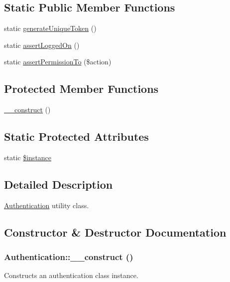 \subsection*{Static Public Member Functions}
\begin{DoxyCompactItemize}
\item 
static \hyperlink{classAuthentication_a8df399ee7f9eca617e6249935dae2a88}{generateUniqueToken} ()
\item 
static \hyperlink{classAuthentication_a6e29c7efa70a367135d3e7bf464fad52}{assertLoggedOn} ()
\item 
static \hyperlink{classAuthentication_a11dc5e2b83d14bcbcc35c7dd5584a1e5}{assertPermissionTo} (\$action)
\end{DoxyCompactItemize}
\subsection*{Protected Member Functions}
\begin{DoxyCompactItemize}
\item 
\hyperlink{classAuthentication_a123a88a49f2dea1247f39a60de1c722c}{\_\-\_\-construct} ()
\end{DoxyCompactItemize}
\subsection*{Static Protected Attributes}
\begin{DoxyCompactItemize}
\item 
static \hyperlink{classAuthentication_afc3982cbe2a9766da03e6291249eddb4}{\$instance}
\end{DoxyCompactItemize}


\subsection{Detailed Description}
\hyperlink{classAuthentication}{Authentication} utility class. 

\subsection{Constructor \& Destructor Documentation}
\hypertarget{classAuthentication_a123a88a49f2dea1247f39a60de1c722c}{
\subsubsection[{\_\-\_\-construct}]{\setlength{\rightskip}{0pt plus 5cm}Authentication::\_\-\_\-construct ()}}
\label{classAuthentication_a123a88a49f2dea1247f39a60de1c722c}
Constructs an authentication class instance. 

